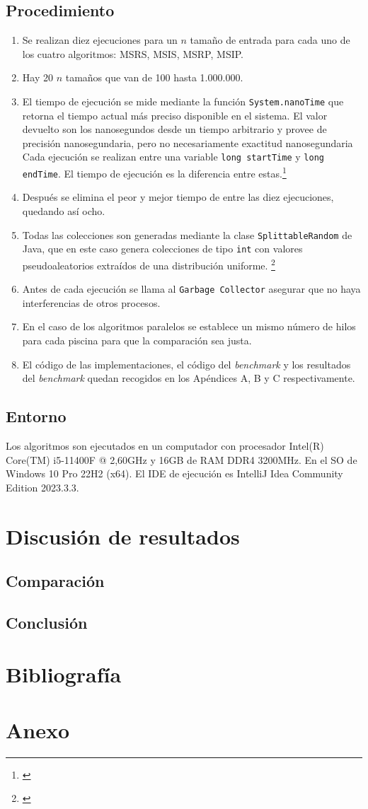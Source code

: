 \documentclass[titlepage]{article}
\begin{document}
\subsection{Procedimiento}
\begin{enumerate}
    \item Se realizan diez ejecuciones para un \(n\) tamaño de entrada para cada uno de los cuatro algoritmos: MSRS, MSIS, MSRP, MSIP.
    \item Hay 20 \(n\) tamaños que van de 100 hasta 1.000.000.
    \item El tiempo de ejecución se mide mediante la función \lstinline{System.nanoTime} que retorna el tiempo actual más preciso disponible en el sistema. El valor devuelto son los nanosegundos desde un tiempo arbitrario y provee de precisión nanosegundaria, pero no necesariamente exactitud nanosegundaria Cada ejecución se realizan entre una variable \lstinline{long startTime} y \lstinline{long endTime}. El tiempo de ejecución es la diferencia entre estas.\footnote{\cite{OracleSystem}}
    \item Después se elimina el peor y mejor tiempo de entre las diez ejecuciones, quedando así ocho.
    \item Todas las colecciones son generadas mediante la clase \lstinline{SplittableRandom} de Java, que en este caso genera colecciones de tipo \lstinline{int} con valores pseudoaleatorios extraídos de una distribución uniforme. \footnote{\cite{OracleSplittableRandom}}
    \item Antes de cada ejecución se llama al \lstinline{Garbage Collector} asegurar que no haya interferencias de otros procesos.
    \item En el caso de los algoritmos paralelos se establece un mismo número de hilos para cada piscina para que la comparación sea justa.
    \item El código de las implementaciones, el código del \textit{benchmark} y los resultados del \textit{benchmark} quedan recogidos en los Apéndices A, B y C respectivamente.
\end{enumerate}

\subsection{Entorno}
Los algoritmos son ejecutados en un computador con procesador Intel(R) Core(TM) i5-11400F @ 2,60GHz y 16GB de RAM DDR4 3200MHz. En el SO de Windows 10 Pro 22H2 (x64). El IDE de ejecución es IntelliJ Idea Community Edition 2023.3.3.

\section{Discusión de resultados}
\subsection{Comparación}
\subsection{Conclusión}

\section{Bibliografía}

\section{Anexo}
\end{document}
